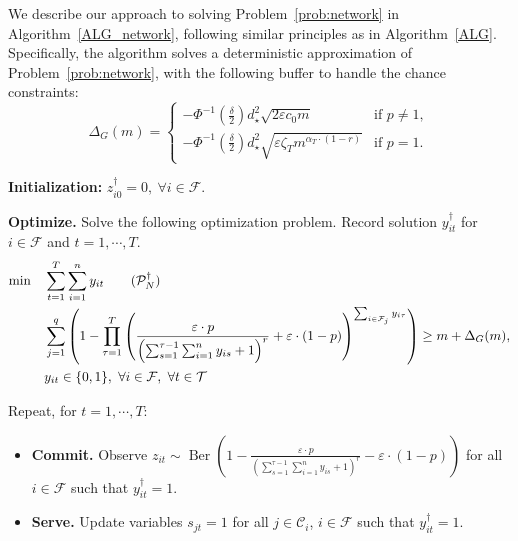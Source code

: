 \documentclass[nonblindrev]{informs3noheader}
\DeclareMathOperator\Ber{Ber}
\def\calC{\mathcal{C}}
\def\calF{\mathcal{F}}
\def\calP{\mathcal{P}}
\def\calT{\mathcal{T}}
\begin{document}
We describe our approach to solving Problem~\eqref{prob:network} in Algorithm~\ref{ALG_network}, following similar principles as in Algorithm~\ref{ALG}. Specifically, the algorithm solves a deterministic approximation of Problem~\eqref{prob:network}, with the following buffer to handle the chance constraints:
\begin{equation*}
	\Delta_G(m) = \begin{cases}
		-\Phi^{-1}\left(\frac{\delta}{2}\right)d_\star^2\sqrt{2\varepsilon c_0 m}& \text{if }p\neq1,\\
			-\Phi^{-1}\left(\frac{\delta}{2}\right)d_\star^2\sqrt{\varepsilon \zeta_T m^{\alpha_T \cdot (1-r)}}& \text{if }p =1.
	\end{cases}
\end{equation*}
\begin{algorithm} [h!]
\caption{Algorithm to solve Problem~\eqref{prob:network}.}\small
\label{ALG_network}
\begin{algorithmic}
\item \textbf{Initialization:} $z^\dagger_{i0}=0,\ \forall i\in\calF$.
\item \textbf{Optimize.} Solve the following optimization problem. Record solution $y^\dagger_{it}$ for $i\in\calF$ and $t=1,\cdots, T$.
\begin{align}
    \min \quad & \sum_{t=1}^T \sum_{i=1}^n y_{it} \label{prob:network_ALG}\tag{$\calP_N^\dagger$}\\
    \quad& \sum_{j=1}^q \left(1-\prod_{\tau=1}^T \left(\frac{\varepsilon\cdot p }{\left(\sum_{s=1}^{\tau-1} \sum_{i=1}^n y_{is} +1\right)^r}+\varepsilon\cdot(1-p)\right)^{\sum_{i \in \calF_j} y_{i\tau}}\right) \geq m+\Delta_G(m),\nonumber\\
    \quad& y_{it}\in\{0,1\},\ \forall i\in \calF, \ \forall t\in\calT\nonumber
\end{align}
\item Repeat, for $t=1,\cdots,T$:
\begin{itemize}
    \item[] \textbf{Commit.} Observe $z_{it}\sim \Ber\left(1-\frac{\varepsilon\cdot p}{\left(\sum_{s=1}^{\tau-1} \sum_{i=1}^n y_{is} +1\right)^r}-\varepsilon\cdot(1-p)\right)$ for all $i\in\calF$ such that $y^\dagger_{it}=1$.
    \item[] \textbf{Serve.} Update variables $s_{jt}=1$ for all $j\in\calC_i$, $i\in\calF$ such that $y^\dagger_{it}=1$.
\end{itemize}
\end{algorithmic}
\end{algorithm}
\end{document}

